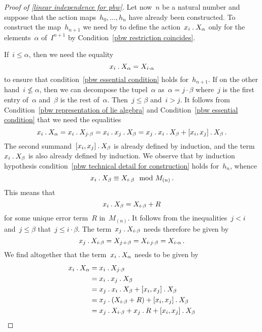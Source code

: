 \begin{proof}[Proof of \cref{linear independence for pbw}]
	Let now~$n$ be a natural number and suppose that the action maps~$h_0, \dotsc, h_n$ have already been constructed.
	To construct the map~$h_{n+1}$ we need by to define the action~$x_i \mathbin{.} X_\alpha$ only for the elements~$\alpha$ of~$I^{n+1}$ by Condition~\ref*{pbw restriction coincides}.
	
	If~$i \leq \alpha$, then we need the equality
	\begin{equation}
		\label{formula for smaller case}
		x_i \mathbin{.} X_\alpha
		=
		X_{i \cdot \alpha}
	\end{equation}
	to ensure that condition~\ref{pbw essential condition} holds for~$h_{n+1}$.
	If on the other hand~$i \nleq \alpha$, then we can decompose the tupel~$\alpha$ as~$\alpha = j \cdot \beta$ where~$j$ is the first entry of~$\alpha$ and~$\beta$ is the rest of~$\alpha$.
	Then~$j \leq \beta$ and~$i > j$.
	It follows from Condition~\ref{pbw representation of lie algebra} and Condition~\ref{pbw essential condition} that we need the equalities
	\[
		x_i \mathbin{.} X_\alpha
		=
		x_i \mathbin{.} X_{j \cdot \beta}
		=
		x_i \mathbin{.} x_j \mathbin{.} X_\beta
		=
		x_j \mathbin{.} x_i \mathbin{.} X_\beta + [x_i, x_j] \mathbin{.} X_\beta  \,.
	\]
	The second summand~$[x_i, x_j] \mathbin{.} X_\beta$ is already defined by induction, and the term~$x_i \mathbin{.} X_\beta$ is also already defined by induction.
	We observe that by induction hypothesis condition~\ref{pbw technical detail for construction} holds for~$h_n$, whence
	\[
		x_i \mathbin{.} X_\beta
		\equiv
		X_{i \cdot \beta}
		\mod
		M_{(n)} \,.
	\]
	This means that
	\[
		x_i \mathbin{.} X_\beta = X_{i \cdot \beta} + R
	\]
	for some unique error term~$R$ in~$M_{(n)}$.
	It follows from the inequalities~$j < i$ and~$j \leq \beta$ that~$j \leq i \cdot \beta$.
	The term~$x_j \mathbin{.} X_{i \cdot \beta}$ needs therefore be given by
	\[
		x_j \mathbin{.} X_{i \cdot \beta}
		=
		X_{j \cdot i \cdot \beta}
		=
		X_{i \cdot j \cdot \beta}
		=
		X_{i \cdot \alpha}  \,.
	\]
	We find altogether that the term~$x_i \mathbin{.} X_\alpha$ needs to be given by
	\begin{align}
		x_i \act X_\alpha
		\notag
		&=
		x_i \act X_{j \cdot \beta}
		\notag
		\\
		&=
		x_i \act x_j \act X_\beta
		\notag
		\\
		&=
		x_j \act x_i \act X_\beta + [x_i, x_j] \act X_\beta
		\notag
		\\
		&=
		x_j \act (X_{i \cdot \beta} + R) + [x_i, x_j] \act X_\beta
		\notag
		\\
		&=
		x_j \act X_{i \cdot \beta} + x_j \act R + [x_i, x_j] \act X_\beta
		\notag
		\\

\end{align}
\end{proof}
